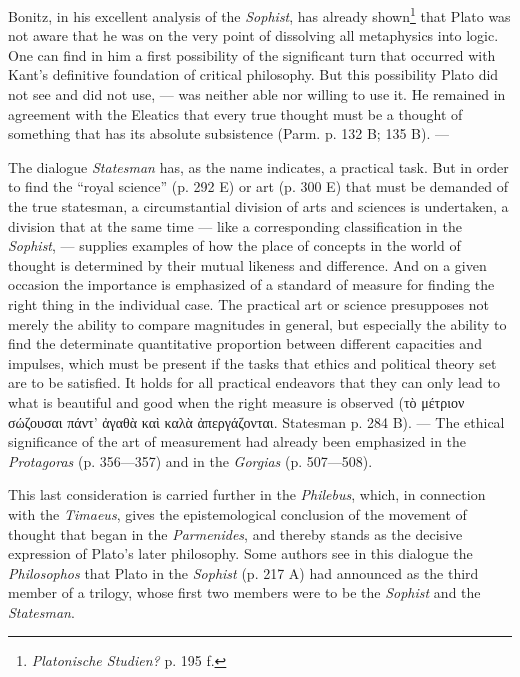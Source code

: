 \documentclass[12pt,a4paper,openany]{book}
\newcommand{\opage}[1]{\marginnote{\footnotesize\textit{[#1]}}}
\begin{document}
Bonitz, in his excellent analysis of the \textit{Sophist}, has already
shown\footnote[2]{\textit{Platonische Studien?} p. 195 f.} that Plato was not aware that he
was on the very point of dissolving all metaphysics into logic.  One can find
in him a first possibility of the significant turn
that occurred with Kant's definitive foundation of
critical philosophy.  But this possibility Plato did not see
and did not use, --- was neither able nor willing to use
it.  He remained in agreement with the Eleatics that every
true thought must be a thought of something that has its
absolute subsistence (Parm. p. 132 B; 135 B). ---

The dialogue \textit{Statesman} has, as the name indicates, a
practical task.  But in order to find the ``royal science''
(p. 292 E) or art (p. 300 E) that must be demanded
of the true statesman, a circumstantial division
of arts and sciences is undertaken, a division that at the same time --- like
a corresponding classification in the \textit{Sophist}, --- supplies
examples of how the place of concepts in the world of thought
is determined by their mutual likeness and difference.  And
on a given occasion the importance is emphasized of a standard of measure
for finding the right thing in the individual case.  The
practical art or science presupposes not merely the ability
to compare magnitudes in general, but especially the ability
\setcounter{footnote}{0}%
\opage{59}to find the determinate quantitative proportion between different
capacities and impulses, which must be present if the tasks
that ethics and political theory set are to be satisfied.
It holds for all practical endeavors that they can only
lead to what is beautiful and good when the right measure
is observed (τὸ μέτριον σώζουσαι πάντ’ ἀγαθὰ καὶ καλὰ ἀπεργάζονται.
Statesman p. 284 B). --- The ethical significance of the art of measurement
had already been emphasized in the \textit{Protagoras} (p. 356—357)
and in the \textit{Gorgias} (p. 507—508).

This last consideration is carried further in the \textit{Philebus}, which,
in connection with the \textit{Timaeus}, gives the epistemological
conclusion of the movement of thought that began in the
\textit{Parmenides}, and thereby stands as the decisive expression
of Plato's later philosophy.  Some authors see in this
dialogue the \textit{Philosophos} that Plato in the \textit{Sophist} (p. 217 A)
had announced as the third member of a trilogy, whose first two
members were to be the \textit{Sophist} and the \textit{Statesman}.
\end{document}
